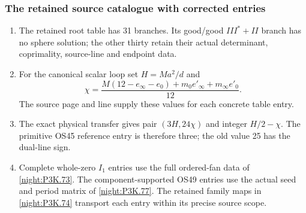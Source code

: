 \subsubsection{The retained source catalogue with corrected entries}
\RungOne
\begin{enumerate}[label=\arabic*.]
\item The retained root table has 31 branches. Its
  good/good $III^*+II$ branch has no sphere solution;
  the other thirty retain their actual determinant,
  coprimality, source-line and endpoint data.
\item For the canonical scalar loop set $H=Ma^2/d$ and
  \[
  \chi=\frac{M(12-e_\infty-e_0)+m_0e'_\infty+m_\infty e'_0}{12}.
  \]
  The source page and line supply these values for each
  concrete table entry.
\item The exact physical transfer gives pair $(3H,24\chi)$
  and integer $H/2-\chi$. The primitive OS45 reference
  entry is therefore three; the old value 25 has the
  dual-line sign.
\item Complete whole-zero $I_1$ entries use the full
  ordered-fan data of \cref{night:P3K.73}. The
  component-supported OS49 entries use the actual seed
  and period matrix of \cref{night:P3K.77}.
  The retained family maps in \cref{night:P3K.74}
  transport each entry within its precise source scope.
\end{enumerate}

